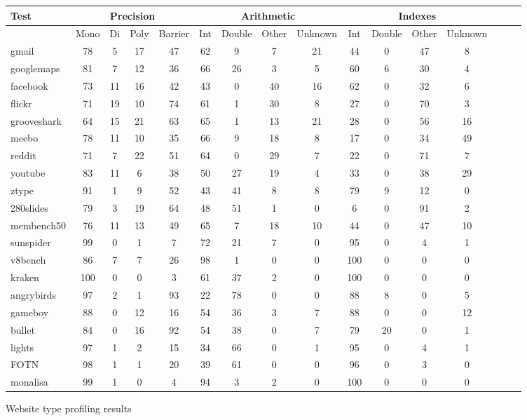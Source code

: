 \begin{figure*}
\begin{center}
\begin{tabular}{|l|ccc|c|cccc|cccc|ccc|}
\hline
Test
& \multicolumn{4}{|c|}{Precision}
& \multicolumn{4}{|c|}{Arithmetic}
& \multicolumn{4}{|c|}{Indexes} \\
\hline
& Mono & Di & Poly & Barrier
& Int & Double & Other & Unknown
& Int & Double & Other & Unknown \\
\hline
gmail          & 78 & 5  & 17 & 47 & 62 & 9  & 7  & 21 & 44 & 0 & 47 & 8 \\
googlemaps     & 81 & 7  & 12 & 36 & 66 & 26 & 3  & 5  & 60 & 6 & 30 & 4 \\
facebook       & 73 & 11 & 16 & 42 & 43 & 0 & 40 & 16 & 62 & 0 & 32 & 6 \\
flickr         & 71 & 19 & 10 & 74 & 61 & 1 & 30 & 8 & 27 & 0 & 70 & 3 \\
grooveshark    & 64 & 15 & 21 & 63 & 65 & 1 & 13 & 21 & 28 & 0 & 56 & 16 \\
meebo          & 78 & 11 & 10 & 35 & 66 & 9 & 18 & 8 & 17 & 0 & 34 & 49 \\
reddit         & 71 & 7 & 22 & 51 & 64 & 0 & 29 & 7 & 22 & 0 & 71 & 7 \\
youtube        & 83 & 11 & 6 & 38 & 50 & 27 & 19 & 4 & 33 & 0 & 38 & 29 \\
ztype          & 91 & 1 & 9 & 52 & 43 & 41 & 8 & 8 & 79 & 9 & 12 & 0 \\
280slides      & 79 & 3 & 19 & 64 & 48 & 51 & 1 & 0 & 6 & 0 & 91 & 2 \\
membench50     & 76 & 11 & 13 & 49 & 65 & 7  & 18 & 10 & 44 & 0 & 47 & 10 \\
sunspider      & 99 & 0  & 1  & 7  & 72 & 21 & 7  & 0  & 95 & 0 & 4  & 1  \\
v8bench        & 86 & 7  & 7  & 26 & 98 & 1  & 0  & 0  & 100 & 0 & 0 & 0  \\
kraken         & 100 & 0 & 0  & 3  & 61 & 37 & 2  & 0  & 100 & 0 & 0 & 0  \\
angrybirds     & 97 & 2 & 1 & 93 & 22 & 78 & 0 & 0 & 88 & 8 & 0 & 5 \\
gameboy        & 88 & 0 & 12 & 16 & 54 & 36 & 3 & 7 & 88 & 0 & 0 & 12 \\
bullet         & 84 & 0 & 16 & 92 & 54 & 38 & 0 & 7 & 79 & 20 & 0 & 1 \\
lights         & 97 & 1 & 2 & 15 & 34 & 66 & 0 & 1 & 95 & 0 & 4 & 1 \\
FOTN           & 98 & 1 & 1 & 20 & 39 & 61 & 0 & 0 & 96 & 0 & 3 & 0 \\
monalisa       & 99 & 1 & 0 & 4 & 94 & 3 & 2 & 0 & 100 & 0 & 0 & 0 \\
\hline
\end{tabular}
\end{center}
\caption{Website type profiling results}
\end{figure*}


